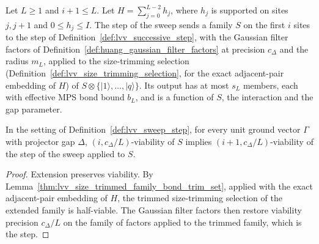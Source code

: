 \begin{definition}
    \label{def:lvv_sweep_step}
    \leanok
    Let $L\ge1$ and $i+1\le L$. Let $H=\sum_{j=0}^{L-2}h_j$, where $h_j$ is
    supported on sites $j,j+1$ and $0\le h_j\le I$. The step of the sweep
    sends a family $S$ on the first $i$ sites to the step of
    Definition~\ref{def:lvv_successive_step}, with the Gaussian filter factors
    of Definition~\ref{def:huang_gaussian_filter_factors} at precision
    $c_\Delta$ and the radius $m_L$, applied to the size-trimming selection
    (Definition~\ref{def:lvv_size_trimming_selection}, for the exact
    adjacent-pair embedding of $H$) of $S\otimes\{|1\rangle,\ldots,|q\rangle\}$.
    Its output has at most $s_L$ members, each with effective MPS bond bound
    $b_L$, and is a function of $S$, the interaction and the gap parameter.
\end{definition}

\begin{lemma}
    \label{thm:lvv_complete_successive_step_factors}
    \leanok
    In the setting of Definition~\ref{def:lvv_sweep_step}, for every unit
    ground vector $\Gamma$ with projector gap $\Delta$,
    $(i,c_\Delta/L)$-viability of $S$ implies $(i+1,c_\Delta/L)$-viability
    of the step of the sweep applied to $S$.
\end{lemma}
\begin{proof}
    \leanok
    Extension preserves viability. By
    Lemma~\ref{thm:lvv_size_trimmed_family_bond_trim_set}, applied with the
    exact adjacent-pair embedding of $H$, the trimmed size-trimming selection
    of the extended family is half-viable. The Gaussian filter factors then
    restore viability precision $c_\Delta/L$ on the family of factors applied
    to the trimmed family, which is the step.
\end{proof}

